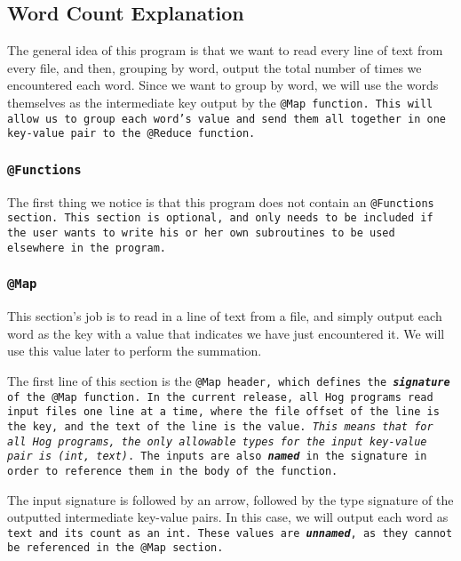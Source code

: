 \documentclass{article} \usepackage{fancyhdr, multicol}
\begin{document}

\subsection*{Word Count Explanation}

The general idea of this program is that we want to read every line of text from
every file, and then, grouping by word, output the total number of times we
encountered each word. Since we want to group by word, we will use the words
themselves as the intermediate key output by the \tt @Map \rm function. This will
allow us to group each word's value and send them all together in one key-value
pair to the \tt @Reduce \rm function.

\subsubsection*{\tt @Functions \rm}

The first thing we notice is that this program does not contain an \tt @Functions
\rm section. This section is optional, and only needs to be included if the user
wants to write his or her own subroutines to be used elsewhere in the program.

\subsubsection*{\tt @Map \rm}

This section's job is to read in a line of text from a file, and simply output each
word as the key with a value that indicates we have just encountered it. We will
use this value later to perform the summation.

The first line of this section is the \tt @Map \rm header, which defines the
\textbf{\emph{signature}} of the \tt @Map \rm function. In the current release, all
Hog programs read input files one line at a time, where the file offset of the line
is the key, and the text of the line is the value. \emph{This means that for all
Hog programs, the only allowable types for the input key-value pair is \tt (int\rm,
\tt text)\rm}. The inputs are also \textbf{\emph{named}} in the signature in order
to reference them in the body of the function.

The input signature is followed by an arrow, followed by the type signature of the
outputted intermediate key-value pairs. In this case, we will output each word as
\tt text \rm and its count as an \tt int\rm. These values are
\textbf{\emph{unnamed}}, as they cannot be referenced in the \tt @Map \rm section.
\end{document}
